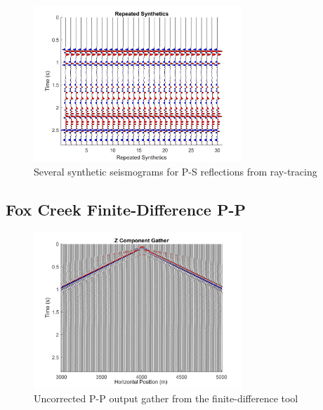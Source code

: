 \documentclass[12pt]{article}
\begin{document}
\begin{figure}[!htb]
	\centering
	\includegraphics[width=0.7\textwidth]{Figures/RTCSeveralSynthetics.png}
	\caption[Fox Creek ray-tracing several P-S synthetic seismograms]{Several synthetic seismograms for P-S reflections from ray-tracing}
	\label{fig:RTCSeveralSynthetics}
\end{figure}
\FloatBarrier
\pagebreak
\subsection{Fox Creek Finite-Difference P-P}

\begin{figure}[!htb]
	\centering
	\includegraphics[width=0.7\textwidth]{Figures/FDCZgather.png}
	\caption[Fox Creek finite-difference P-P gather]{Uncorrected P-P output gather from the finite-difference tool}
	\label{fig:FDCZgather}
\end{figure}
\end{document}
